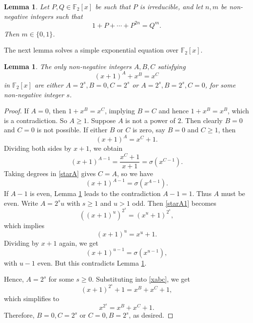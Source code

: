 \documentclass[12pt, reqno]{article}
\theoremstyle{plain}
\newtheorem{lemma}[theorem]{Lemma}
\theoremstyle{definition}
\theoremstyle{remark}
\def\F{\mathbb{F}}
\begin{document}
\begin{lemma}
\label{L5Canaday}
Let \( P, Q \in \F_2[x] \) be such that \( P \) is irreducible, and let \( n, m \) be non-negative integers such that
\[
1 + P + \cdots + P^{2n} = Q^m.
\]
Then \( m \in \{0,1\} \).
\end{lemma}

The next lemma solves a simple exponential equation over \( \F_2[x] \).

\begin{lemma}
\label{ABC}
The only non-negative integers \( A, B, C \) satisfying
\begin{equation}
\label{xabc}
(x+1)^A + x^B = x^C
\end{equation}
in \( \F_2[x] \)
are either \( A = 2^s, B = 0, C = 2^s \) or \( A = 2^s, B = 2^s, C = 0 \), for some non-negative integer \( s \).
\end{lemma}

\begin{proof}
If \( A = 0 \), then \( 1 + x^B = x^C \), implying \( B = C \) and hence \( 1 + x^B = x^B \), which is a contradiction. So \( A \geq 1 \). Suppose \( A \) is not a power of \( 2 \). Then clearly \( B = 0 \) and \( C = 0 \) is not possible. If either \( B \) or \( C \) is zero, say \( B = 0 \) and \( C \geq 1 \), then
\begin{equation}
\label{starA1}
(x+1)^A = x^C + 1.
\end{equation}
Dividing both sides by \( x+1 \), we obtain
\begin{equation}
\label{starA}
(x+1)^{A-1} = \frac{x^C+1}{x+1} = \sigma(x^{C-1}).
\end{equation}
Taking degrees in \eqref{starA} gives \( C = A \), so we have
\begin{equation}
\label{starB}
(x+1)^{A-1} = \sigma(x^{A-1}).
\end{equation}
If \( A - 1 \) is even, Lemma \ref{L5Canaday} leads to the contradiction \( A - 1 = 1 \). Thus \( A \) must be even. Write \( A = 2^s u \) with \( s \geq 1 \) and \( u > 1 \) odd. Then \eqref{starA1} becomes
\begin{equation}
\label{starC}
((x+1)^u)^{2^s} = (x^u + 1)^{2^s},
\end{equation}
which implies
\begin{equation}
\label{starC1}
(x+1)^u = x^u + 1.
\end{equation}
Dividing by \( x+1 \) again, we get
\begin{equation}
\label{starC2}
(x+1)^{u-1} = \sigma(x^{u-1}),
\end{equation}
with \( u - 1 \) even. But this contradicts Lemma \ref{L5Canaday}.

Hence, \( A = 2^s \) for some \( s \geq 0 \). Substituting into \eqref{xabc}, we get
\begin{equation}
\label{starF}
(x+1)^{2^s} + 1 = x^B + x^C + 1,
\end{equation}
which simplifies to
\begin{equation}
\label{starG}
x^{2^s} = x^B + x^C + 1.
\end{equation}
Therefore, \( B = 0, C = 2^s \) or \( C = 0, B = 2^s \), as desired.
\end{proof}
\end{document}
